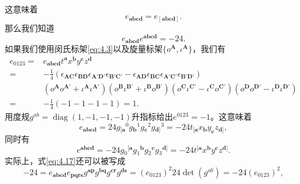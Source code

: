 这意味着
\begin{equation*}
	e_{\boldsymbol{abcd}} =e_{[\boldsymbol{abcd}]} .
\end{equation*}
那么我们知道
\begin{equation}
	e_{\boldsymbol{abcd}} e^{\boldsymbol{abcd}} =-24.
	\label{eq:4.17}
\end{equation}
如果我们使用闵氏标架\ref{eq:4.3}以及旋量标架$\{o^{\boldsymbol{A}} ,\iota ^{\boldsymbol{A}} \}$，我们有
\begin{equation*}
	\begin{aligned}
		e_{0123} = & e_{\boldsymbol{abcd}} t^{\boldsymbol{a}} x^{\boldsymbol{b}} y^{\boldsymbol{c}} z^{\boldsymbol{d}}\\
		= & -\frac{1}{4}( \epsilon \boldsymbol{_{AC}} \epsilon \boldsymbol{_{BD}} \epsilon _{\boldsymbol{A'D} '} \epsilon _{\boldsymbol{B} '\boldsymbol{C} '} -\epsilon _{\boldsymbol{AD}} \epsilon _{\boldsymbol{BC}} \epsilon \boldsymbol{_{A'C'}} \epsilon \boldsymbol{_{B'D'}})\\
		& (o^{\boldsymbol{A}} o^{\boldsymbol{A} '} +\iota ^{\boldsymbol{A}} \iota ^{\boldsymbol{A} '} )(o^{\boldsymbol{B}} \iota ^{\boldsymbol{B} '} +\iota ^{\boldsymbol{B}} o^{\boldsymbol{B} '} )(o^{\boldsymbol{C}} \iota ^{\boldsymbol{C} '} -\iota ^{\boldsymbol{C}} o^{\boldsymbol{C} '} )(o^{\boldsymbol{D}} o^{\boldsymbol{D} '} -\iota ^{\boldsymbol{D}} \iota ^{\boldsymbol{D} '} )\\
		= & -\frac{1}{4} (-1-1-1-1 )=1.
	\end{aligned}
\end{equation*}
用度规$g^{ab} =\operatorname{diag}( 1,-1,-1,-1)$升指标给出$e^{0123} =-1$。这意味着
\begin{equation*}
	e_{\boldsymbol{abcd}} =24g{_{[\boldsymbol{a}}}^{0} g{_{\boldsymbol{b}}}^{1} g{_{\boldsymbol{c}}}^{2} g{_{\boldsymbol{d}]}}^{3} =-24t_{[\boldsymbol{a}} x_{\boldsymbol{b}} y_{\boldsymbol{c}} z_{\boldsymbol{d}]} ,
\end{equation*}
同时有
\begin{equation*}
	e^{\boldsymbol{abcd}} =-24g{_{0}}^{[\boldsymbol{a}} g{_{1}}^{\boldsymbol{b}} g{_{2}}^{\boldsymbol{c}} g{_{3}}^{\boldsymbol{d}]} =-24t^{[\boldsymbol{a}} x^{\boldsymbol{b}} y^{\boldsymbol{c}} z^{\boldsymbol{d}]} .
\end{equation*}
实际上，式\ref{eq:4.17}还可以被写成
\begin{equation*}
	-24=e_{\boldsymbol{abcd}} e_{\boldsymbol{pqrs}} g^{\boldsymbol{ap}} g^{\boldsymbol{bq}} g^{\boldsymbol{cr}} g^{\boldsymbol{ds}} =(e_{0123} )^{2} 24\det (g^{ab} )=-24(e_{0123} )^{2} ,
\end{equation*}
